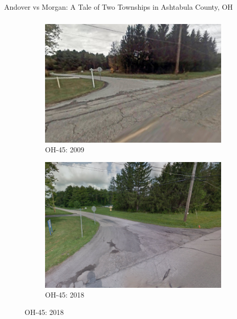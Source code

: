 \documentclass{beamer}
\begin{document}
\begin{frame}{Andover vs Morgan: A Tale of Two Townships in Ashtabula County, OH}
    \frametitle{}

\begin{figure}[htbp]
    \centering
    \begin{minipage}[b]{0.49\textwidth}
        \centering
        \begin{subfigure}[b]{\textwidth}
            \centering
            \includegraphics[width=\textwidth,keepaspectratio]{assets/imgs/morgan_township_2801OH-45_2009.png}
            \caption{OH-45: 2009}
            \label{fig:morgan_oh_2009}
        \end{subfigure}
    \end{minipage}
    \hfill
    \begin{minipage}[b]{0.49\textwidth}
        \centering
        \begin{subfigure}[b]{\textwidth}
            \centering
            \includegraphics[width=\textwidth,keepaspectratio]{assets/imgs/morgan_township_2801OH-45_2018.png}
            \caption{OH-45: 2018}
            \label{fig:morgan_oh_2018}
        \end{subfigure}
    \end{minipage}        
\end{figure}

\end{frame}
        
\end{document}
